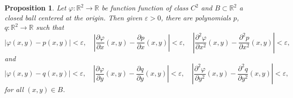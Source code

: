 \documentclass[11pt]{amsart}
\newtheorem{proposition}{Proposition}
\begin{document}
\begin{proposition}\label{P3}
	Let $\varphi\colon\mathbb{R}^2\to\mathbb{R}$ be function function of class $C^2$ and $B\subset\mathbb{R}^2$ a closed ball centered at the origin. Then given $\varepsilon>0$, there are polynomials $p$, $q\colon\mathbb{R}^2\to\mathbb{R}$ such that
		\[|\varphi(x,y)-p(x,y)|<\varepsilon, \quad \left|\frac{\partial\varphi}{\partial x}(x,y)-\frac{\partial p}{\partial x}(x,y)\right|<\varepsilon, \quad \left|\frac{\partial^2\varphi}{\partial x^2}(x,y)-\frac{\partial^2 p}{\partial x^2}(x,y)\right|<\varepsilon,\]
	and
		\[|\varphi(x,y)-q(x,y)|<\varepsilon, \quad \left|\frac{\partial\varphi}{\partial y}(x,y)-\frac{\partial q}{\partial y}(x,y)\right|<\varepsilon, \quad \left|\frac{\partial^2\varphi}{\partial y^2}(x,y)-\frac{\partial^2 q}{\partial y^2}(x,y)\right|<\varepsilon,\]		
	for all $(x,y)\in B$.
\end{proposition}
\end{document}
